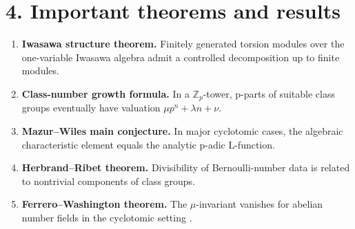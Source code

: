 \section*{4. Important theorems and results}
\begin{enumerate}[leftmargin=*,itemsep=0.35em]
\item \textbf{Iwasawa structure theorem.} Finitely generated torsion modules over the one-variable Iwasawa algebra admit a controlled decomposition up to finite modules.

\item \textbf{Class-number growth formula.} In a $\mathbb Z_p$-tower, p-parts of suitable class groups eventually have valuation $\mu p^n+\lambda n+\nu$.

\item \textbf{Mazur--Wiles main conjecture.} In major cyclotomic cases, the algebraic characteristic element equals the analytic p-adic L-function.

\item \textbf{Herbrand--Ribet theorem.} Divisibility of Bernoulli-number data is related to nontrivial components of class groups.

\item \textbf{Ferrero--Washington theorem.} The $\mu$-invariant vanishes for abelian number fields in the cyclotomic setting \cite{iwasawa_theory_ref4}.
\end{enumerate}

\theoryapplications
{}
